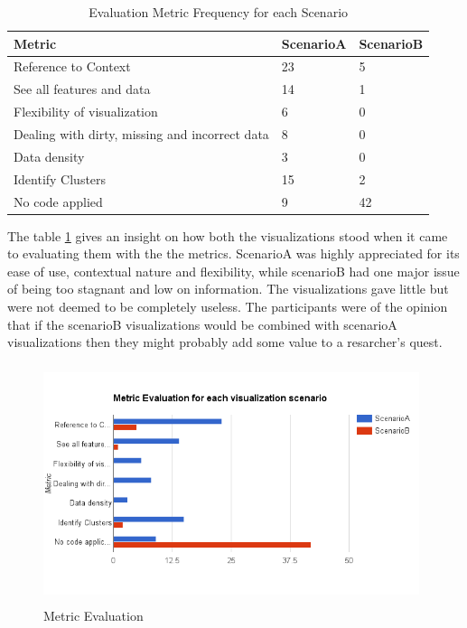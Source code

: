 \documentclass[seploa]{beavtex}
\begin{document}
\begin{table}[H]
\begin{tabular}{ |p{5cm}|p{3cm}|p{3cm}|  }
 \hline
Metric & ScenarioA & ScenarioB\\
 \hline
 Reference to Context & 23 & 5\\ \hline
 See all features and data & 14 & 1\\ \hline
 Flexibility of visualization & 6 & 0\\ \hline
 Dealing with dirty, missing and incorrect data & 8 & 0\\ \hline
 Data density & 3 & 0\\ \hline
 Identify Clusters & 15 & 2\\ \hline
 No code applied & 9 & 42\\ 
 \hline
\end{tabular}
\caption{Evaluation Metric Frequency for each Scenario}
\label{tab:freq}
\end{table}


The table \ref{tab:freq} gives an insight on how both the visualizations stood when it came to evaluating them with the the metrics. ScenarioA was highly appreciated for its ease of use, contextual nature and flexibility, while scenarioB had one major issue of being too stagnant and low on information. The visualizations gave little but were not deemed to be completely useless. The participants were of the opinion that if the scenarioB visualizations would be combined with scenarioA visualizations then they might probably add some value to a resarcher's quest.

\begin{figure}[!ht]
\centering
\includegraphics[width=110mm,height=70mm]{metric.png}
\caption{Metric Evaluation}
\end{figure}
\end{document}
